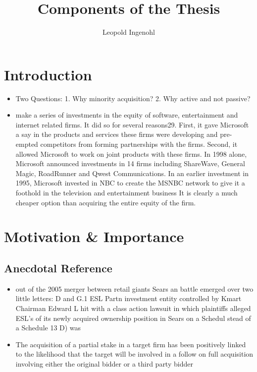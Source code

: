 \documentclass[12pt]{article}
\title{Components of the Thesis}
\author{Leopold Ingenohl}
\begin{document}
\maketitle

\pagebreak

\tableofcontents

\pagebreak

\section{Introduction}

\begin{itemize}
    \item Two Questions: 1. Why minority acquisition? 2. Why active and not passive? 
    \item make a series of investments in the equity of software, entertainment and internet related firms. It did so for several reasons29. First, it gave Microsoft a say in the products and services these firms were developing and pre-empted competitors from forming partnerships with the firms. Second, it allowed Microsoft to work on joint products with these firms. In 1998 alone, Microsoft announced investments in 14 firms including ShareWave, General Magic, RoadRunner and Qwest Communications. In an earlier investment in 1995, Microsoft invested in NBC to create the MSNBC network to give it a foothold in the television and entertainment business \citep{Damodaran2005} It is clearly a much cheaper option than acquiring the entire equity of the firm.
\end{itemize}

\section{Motivation \& Importance} 


\subsection{Anecdotal Reference}

    \begin{itemize}
        
        \item out of the 2005 merger between retail giants Sears an battle emerged over two little letters: D and G.1 ESL Partn investment entity controlled by Kmart Chairman Edward L hit with a class action lawsuit in which plaintiffs alleged ESL's of its newly acquired ownership position in Sears on a Schedul stead of a Schedule 13 D) was \citep{Giglia2018}

        \item The acquisition of a partial stake in a target firm has been positively linked to the likelihood that the target will be involved in a follow on full acquisition involving either the original bidder or a third party bidder \citep{Akhigbe2007}

        

    \end{itemize}
\end{document}

